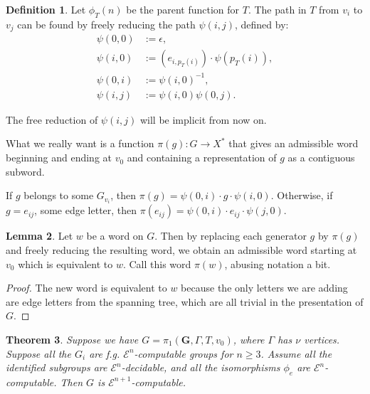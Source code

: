 \documentclass[a4paper]{article}
\newcommand{\grz}[1]{$\mathcal{E}^{#1}$}	%
\newcommand{\fgoagog}{\pi_1(\mathbf{G},\Gamma,T,v_0)}					%
\theoremstyle{plain}
\newtheorem{theorem}{Theorem}[section]
\theoremstyle{definition}
\newtheorem{lemma}[theorem]{Lemma}
\newtheorem{definition}[theorem]{Definition}
\begin{document}
\begin{definition}
Let $\phi_T(n)$ be the parent function for $T$. The path in $T$ from $v_i$ to $v_j$ can be found by freely reducing the path $\psi(i,j)$, defined by:
\begin{equation}\begin{split}
\psi(0,0) &:= \epsilon, \\
\psi(i,0) &:= (e_{i,p_T(i)}) \cdot \psi(p_T(i)), \\
\psi(0,i) &:= \psi(i,0)^{-1}, \\
\psi(i,j) &:= \psi(i,0) \psi(0,j).
\end{split}\end{equation}

The free reduction of $\psi(i,j)$ will be implicit from now on.

What we really want is a function $\pi(g):G \rightarrow X^{\ast}$ that gives an admissible word beginning and ending at $v_0$ and containing a representation of $g$ as a contiguous subword. 

If $g$ belongs to some $G_{v_i}$, then $\pi(g) = \psi(0,i) \cdot g \cdot \psi(i,0)$. Otherwise, if $g = e_{ij}$, some edge letter, then $\pi(e_{ij}) = \psi(0,i) \cdot e_{ij} \cdot \psi(j,0)$.
\end{definition}

\begin{lemma}
Let $w$ be a word on $G$. Then by replacing each generator $g$ by $\pi(g)$ and freely reducing the resulting word, we obtain an admissible word starting at $v_0$ which is equivalent to $w$. Call this word $\pi(w)$, abusing notation a bit.
\end{lemma}

\begin{proof}
The new word is equivalent to $w$ because the only letters we are adding are edge letters from the spanning tree, which are all trivial in the presentation of $G$.
\end{proof}

\begin{theorem} \label{fgoagogcomp}
Suppose we have $G = \fgoagog$, where $\Gamma$ has $\nu$ vertices. Suppose all the $G_i$ are f.g. \grz{n}-computable groups for $n \geq 3$. Assume all the identified subgroups are \grz{n}-decidable, and all the isomorphisms $\phi_e$ are \grz{n}-computable. Then $G$ is \grz{n+1}-computable.
\end{theorem}
\end{document}
